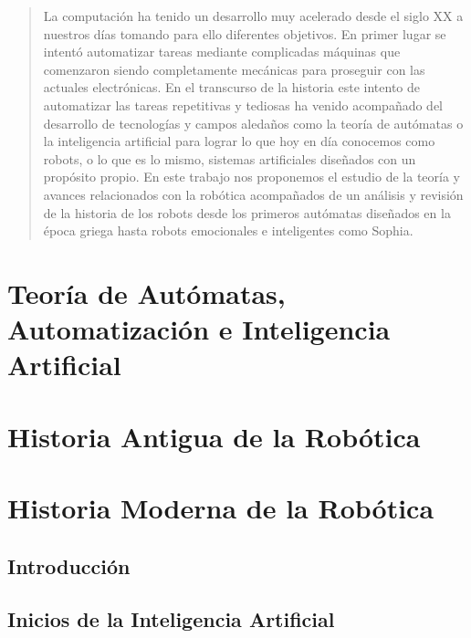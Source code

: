 \documentclass[a4paper,11pt]{article}
\begin{document}
	\newpage
\begin{abstract}
	La computación ha tenido un desarrollo muy acelerado desde el siglo XX a nuestros días tomando para ello diferentes objetivos. En primer lugar se intentó automatizar tareas mediante complicadas máquinas que comenzaron siendo completamente mecánicas para proseguir con las actuales electrónicas. En el transcurso de la historia este intento de automatizar las tareas repetitivas y tediosas ha venido acompañado del desarrollo de tecnologías y campos aledaños como la teoría de autómatas o la inteligencia artificial para lograr lo que hoy en día conocemos como robots, o lo que es lo mismo, sistemas artificiales diseñados con un propósito propio. En este trabajo nos proponemos el estudio de la teoría y avances relacionados con la robótica acompañados de un análisis y revisión de la historia de los robots desde los primeros autómatas diseñados en la época griega hasta robots emocionales e inteligentes como Sophia.
\end{abstract}

\newpage

\tableofcontents

\newpage

\section{Teoría de Autómatas, Automatización e Inteligencia Artificial}

\section{Historia Antigua de la Robótica}



\section{Historia Moderna de la Robótica}

\subsection{Introducción}


\subsection{Inicios de la Inteligencia Artificial}

\end{document}
